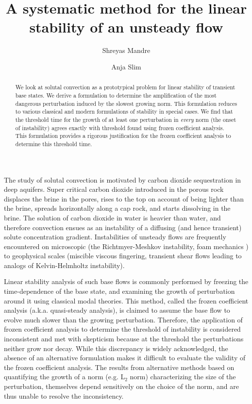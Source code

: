 \documentclass[letterpaper,10pt,prl,twocolumn,aps,reprint]{revtex4-1}
\begin{document}
\title{A systematic method for the linear stability of an unsteady flow}
\author{Shreyas Mandre}
\author{Anja Slim}
\begin{abstract}
We look at solutal convection as a prototypical problem for linear stability of transient base states. We derive a formulation to determine the amplification of the most dangerous perturbation induced by the slowest growing norm. This formulation reduces to various classical and modern formulations of stability in special cases. We find that the threshold time for the growth of at least one perturbation in {\em every} norm (the onset of instability) agrees exactly with threshold found using frozen coefficient analysis. This formulation provides a rigorous justification for the frozen coefficient analysis to determine this threshold time.
\end{abstract}
\maketitle
The study of solutal convection is motivated by carbon dioxide sequestration in deep aquifers\cite{SlimRama10,RapakaChen08,RiazHesse06,EnnisKingPreston05,EnnisKingPaterson05}. Super critical carbon dioxide introduced in the porous rock displaces the brine in the pores, rises to the top on account of being lighter than the brine, spreads horizontally along a cap rock, and starts dissolving in the brine. The solution of carbon dioxide in water is heavier than water, and therefore convection ensues as an instability of a diffusing (and hence transient) solute concentration gradient. Instabilities of unsteady flows are frequently encountered on microscopic (the Richtmyer-Meshkov instability\cite{brouillette2002richtmyer}, foam mechanics \cite{anderson2010foam}) to geophysical scales (miscible viscous fingering\cite{homsy1987viscous}, transient shear flows leading to analogs of Kelvin-Helmholtz instability\cite{thorpe1968method}). 

Linear stability analysis of such base flows is commonly performed by freezing the time-dependence of the base state, and examining the growth of perturbation around it using classical modal theories. This method, called the frozen coefficient analysis (a.k.a. quasi-steady analysis), is claimed to assume the base flow to evolve much slower than the growing perturbation. Therefore, the application of frozen coefficient analysis to determine the threshold of instability is considered inconsistent and met with skepticism because at the threshold the perturbations neither grow nor decay. While this discrepancy is widely acknowledged, the absence of an alternative formulation makes it difficult to evaluate the validity of the frozen coefficient analysis. The results from alternative methods based on quantifying the growth of a norm (e.g. L$_2$ norm) characterizing the size of the perturbation\cite{SlimRama10}, themselves depend sensitively on the choice of the norm, and are thus unable to resolve the inconsistency.
\end{document}
